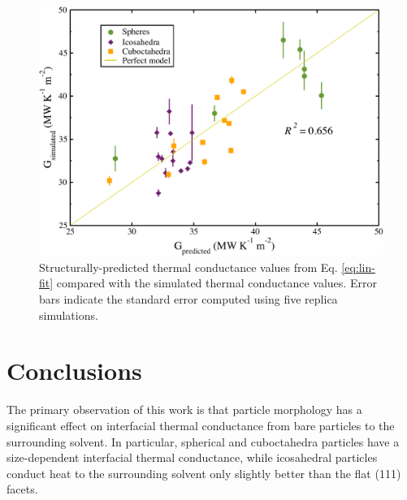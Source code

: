 \begin{figure}
\includegraphics[width=\linewidth]{figures/models.pdf}
 	\caption{Structurally-predicted thermal conductance values from Eq. \eqref{eq:lin-fit} compared with the simulated thermal conductance values. Error bars indicate the standard error computed using five replica simulations. }
    \label{fig:models}
\end{figure}





\section{Conclusions}
The primary observation of this work is that particle morphology has a
significant effect on interfacial thermal conductance from bare
particles to the surrounding solvent.  In particular, spherical and
cuboctahedra particles have a size-dependent interfacial thermal
conductance, while icosahedral particles conduct heat to the
surrounding solvent only slightly better than the flat (111) facets.

